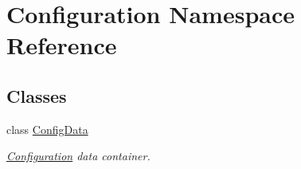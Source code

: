 \hypertarget{namespaceConfiguration}{
\section{Configuration Namespace Reference}
\label{namespaceConfiguration}
}


\subsection*{Classes}
\begin{CompactItemize}
\item 
class \hyperlink{classConfiguration_1_1ConfigData}{Config\-Data}
\begin{CompactList}\small\item\em \hyperlink{namespaceConfiguration}{Configuration} data container. \item\end{CompactList}\end{CompactItemize}
